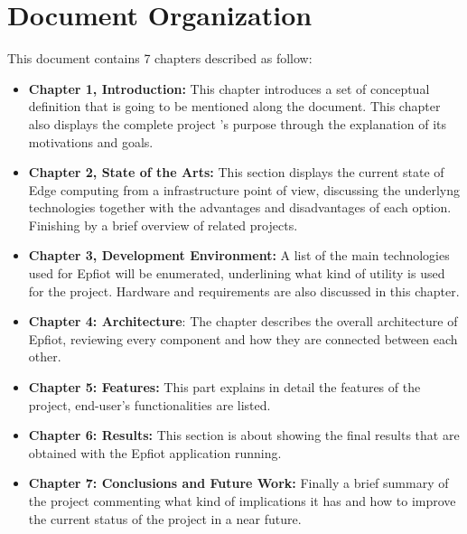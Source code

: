 \newpage
\section{Document Organization}
\label{makereference1.3}

This document contains 7 chapters described as follow:

\begin{itemize}
  \item \textbf{Chapter 1, Introduction:} This chapter introduces a set of conceptual definition that is going to be mentioned along the document. This chapter also displays the complete project 's purpose through the explanation of its motivations and goals.
  \item \textbf{Chapter 2, State of the Arts:} This section displays the current state of Edge computing from a infrastructure point of view, discussing the underlyng technologies together with the advantages and disadvantages of each option. Finishing by a brief overview of related projects.
  \item \textbf{Chapter 3, Development Environment:} A list of the main technologies used for Epfiot will be enumerated, underlining what kind of utility is used for the project. Hardware and requirements are also discussed in this chapter.
  \item \textbf{Chapter 4: Architecture}: The chapter describes the overall architecture of Epfiot, reviewing every component and how they are connected between each other. 
  \item \textbf{Chapter 5: Features:} This part explains in detail the features of the project, end-user's functionalities are listed.   
  \item \textbf{Chapter 6: Results:} This section is about showing the final results that are obtained with the Epfiot application running. 
  \item \textbf{Chapter 7: Conclusions and Future Work:} Finally a brief summary of the project commenting what kind of implications it has and how to improve the current status of the project in a near future. 
\end{itemize}

